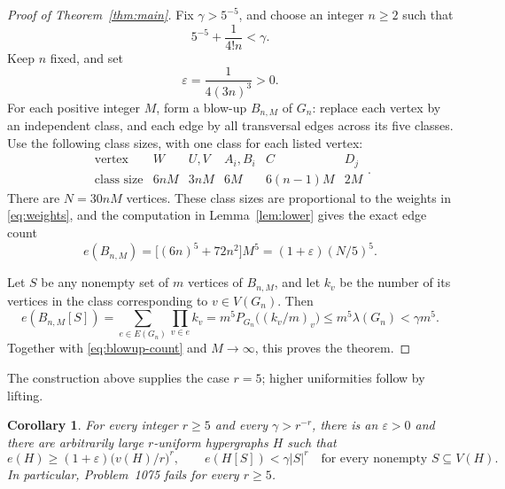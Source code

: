 \documentclass[11pt]{article}
\newtheorem{corollary}[theorem]{Corollary}
\numberwithin{equation}{section}
\begin{document}
\begin{proof}[Proof of Theorem~\ref{thm:main}]
Fix \(\gamma>5^{-5}\), and choose an integer \(n\ge2\) such that
\[
 5^{-5}+\frac1{4!n}<\gamma.
\]
Keep \(n\) fixed, and set
\[
 \varepsilon=\frac1{4(3n)^{3}}>0.
\]
For each positive integer \(M\), form a blow-up \(B_{n,M}\) of
\(G_n\): replace each vertex by an independent class, and each
edge by all transversal edges across its five classes.
Use the following class sizes, with one class for each listed vertex:
\[
 \begin{array}{c|ccccc}
 \text{vertex}&W&U,V&A_i,B_i&C&D_j\\ \hline
 \text{class size}&6nM&3nM&6M&6(n-1)M&2M
 \end{array}.
\]
There are \(N=30nM\) vertices. These class sizes are proportional
to the weights in \eqref{eq:weights}, and the computation in
Lemma~\ref{lem:lower} gives the exact edge count
\begin{equation}\label{eq:blowup-count}
 e(B_{n,M})=\bigl[(6n)^{5}+72n^2\bigr]M^{5}
 =(1+\varepsilon)(N/5)^{5}.
\end{equation}

Let \(S\) be any nonempty set of \(m\) vertices of \(B_{n,M}\),
and let \(k_v\) be the number of its vertices in the class
corresponding to \(v\in V(G_n)\). Then
\[
 e(B_{n,M}[S])
 =\sum_{e\in E(G_n)}\prod_{v\in e}k_v
 =m^{5}P_{G_n}\bigl((k_v/m)_v\bigr)
 \le m^{5}\lambda(G_n)<\gamma m^{5}.
\]
Together with \eqref{eq:blowup-count} and \(M\to\infty\), this
proves the theorem.
\end{proof}

The construction above supplies the case \(r=5\); higher uniformities
follow by lifting.

\begin{corollary}\label{cor:all-r}
For every integer \(r\ge5\) and every \(\gamma>r^{-r}\), there is an
\(\varepsilon>0\) and there are arbitrarily large \(r\)-uniform
hypergraphs \(H\) such that
\[
 e(H)\ge(1+\varepsilon)\bigl(v(H)/r\bigr)^r,
 \qquad
 e(H[S])<\gamma|S|^r
 \quad\text{for every nonempty }S\subseteq V(H).
\]
In particular, Problem~1075 fails for every \(r\ge5\).
\end{corollary}
\end{document}
